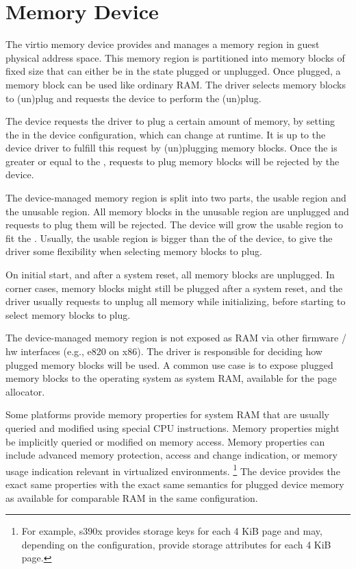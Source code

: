 \section{Memory Device}\label{sec:Device Types / Memory Device}

The virtio memory device provides and manages a memory region in guest
physical address space.  This memory region is partitioned into memory
blocks of fixed size that can either be in the state plugged or unplugged.
Once plugged, a memory block can be used like ordinary RAM.  The driver
selects memory blocks to (un)plug and requests the device to perform the
(un)plug.

The device requests the driver to plug a certain amount of memory, by
setting the  in the device configuration, which can
change at runtime.  It is up to the device driver to fulfill this request
by (un)plugging memory blocks.  Once the  is greater or
equal to the , requests to plug memory blocks will be
rejected by the device.

The device-managed memory region is split into two parts, the usable region
and the unusable region.  All memory blocks in the unusable region are
unplugged and requests to plug them will be rejected.  The device will grow
the usable region to fit the .  Usually, the usable
region is bigger than the  of the device, to give the
driver some flexibility when selecting memory blocks to plug.

On initial start, and after a system reset, all memory blocks are
unplugged.  In corner cases, memory blocks might still be plugged after a
system reset, and the driver usually requests to unplug all memory while
initializing, before starting to select memory blocks to plug.

The device-managed memory region is not exposed as RAM via other firmware
/ hw interfaces (e.g., e820 on x86).  The driver is responsible for
deciding how plugged memory blocks will be used.  A common use case is to
expose plugged memory blocks to the operating system as system RAM,
available for the page allocator.

Some platforms provide memory properties for system RAM that are usually
queried and modified using special CPU instructions. Memory properties might
be implicitly queried or modified on memory access. Memory properties can
include advanced memory protection, access and change indication, or memory
usage indication relevant in virtualized environments. \footnote{For example,
s390x provides storage keys for each 4 KiB page and may, depending on the
configuration, provide storage attributes for each 4 KiB page.} The device
provides the exact same properties with the exact same semantics for
plugged device memory as available for comparable RAM in the same configuration.

